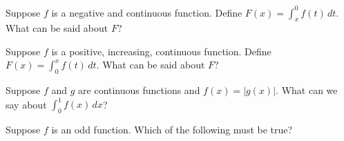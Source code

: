 \documentclass{ximera}
\newcommand{\recommendation}[1]{}
\begin{document}

\begin{problem}
  Suppose $f$ is a negative and continuous function.  Define $F(x) = \int_x^0 f(t) \, dt$.  What can be said about $F$?
  \begin{multipleChoice}
  \end{multipleChoice}
\end{problem}

\begin{problem}
\recommendation{Vic}
  Suppose $f$ is a positive, increasing, continuous function.  Define $F(x) = \int_0^x f(t) \, dt$.  What can be said about $F$?
  \begin{multipleChoice}
  \end{multipleChoice}
\end{problem}

\begin{problem}
  Suppose $f$ and $g$ are continuous functions and $f(x) = |g(x)|$.  What can we say about $\int_0^1 f(x) \, dx$?
  \begin{multipleChoice}
  \end{multipleChoice}
\end{problem}


\begin{problem}
\recommendation{Vic}
  Suppose $f$ is an odd function. Which of the following must be true?
  \begin{multipleChoice}
  \end{multipleChoice}
\end{problem}

\end{document}
